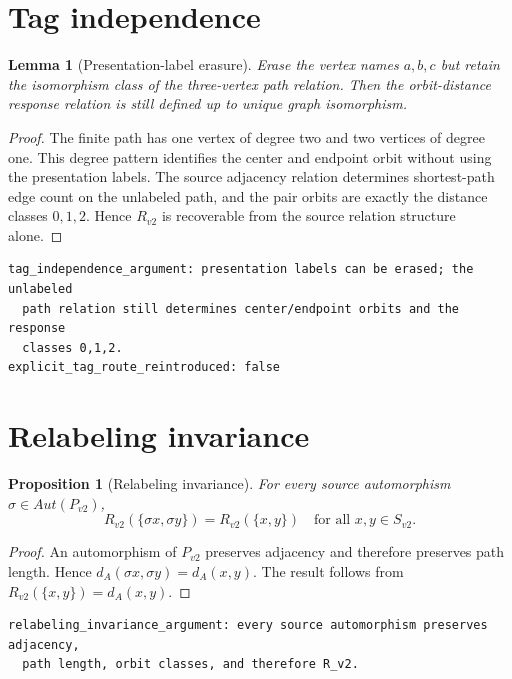 \documentclass[11pt]{article}
\newtheorem{lemma}{Lemma}
\newtheorem{proposition}{Proposition}
\begin{document}
\section{Tag independence}

\begin{lemma}[Presentation-label erasure]
Erase the vertex names \(a,b,c\) but retain the isomorphism class of the
three-vertex path relation. Then the orbit-distance response relation is still
defined up to unique graph isomorphism.
\end{lemma}

\begin{proof}
The finite path has one vertex of degree two and two vertices of degree one.
This degree pattern identifies the center and endpoint orbit without using the
presentation labels. The source adjacency relation determines shortest-path
edge count on the unlabeled path, and the pair orbits are exactly the
distance classes \(0,1,2\). Hence \(R_{v2}\) is recoverable from the source
relation structure alone.
\end{proof}

\begin{verbatim}
tag_independence_argument: presentation labels can be erased; the unlabeled
  path relation still determines center/endpoint orbits and the response
  classes 0,1,2.
explicit_tag_route_reintroduced: false
\end{verbatim}

\section{Relabeling invariance}

\begin{proposition}[Relabeling invariance]
For every source automorphism \(\sigma\in Aut(P_{v2})\),
\[
  R_{v2}(\{\sigma x,\sigma y\})=R_{v2}(\{x,y\})
  \quad\text{for all }x,y\in S_{v2}.
\]
\end{proposition}

\begin{proof}
An automorphism of \(P_{v2}\) preserves adjacency and therefore preserves path
length. Hence \(d_A(\sigma x,\sigma y)=d_A(x,y)\). The result follows from
\(R_{v2}(\{x,y\})=d_A(x,y)\).
\end{proof}

\begin{verbatim}
relabeling_invariance_argument: every source automorphism preserves adjacency,
  path length, orbit classes, and therefore R_v2.
\end{verbatim}
\end{document}

